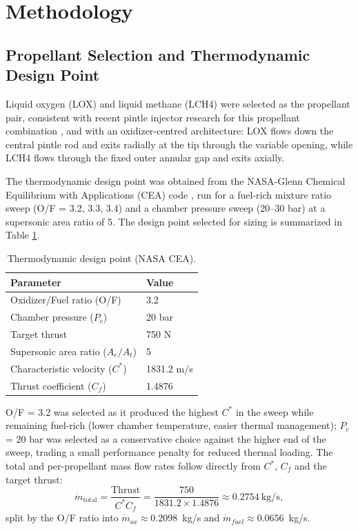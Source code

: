 \documentclass[11pt,a4paper]{article}
\begin{document}
\section{Methodology}

\subsection{Propellant Selection and Thermodynamic Design Point}

Liquid oxygen (LOX) and liquid methane (LCH4) were selected as the propellant pair, consistent with recent pintle injector research for this propellant combination \cite{vasques2017,cha2023}, and with an oxidizer-centred architecture: LOX flows down the central pintle rod and exits radially at the tip through the variable opening, while LCH4 flows through the fixed outer annular gap and exits axially.

The thermodynamic design point was obtained from the NASA-Glenn Chemical Equilibrium with Applications (CEA) code \cite{mcbride1994,gordon1996}, run for a fuel-rich mixture ratio sweep (O/F = 3.2, 3.3, 3.4) and a chamber pressure sweep (20--30 bar) at a supersonic area ratio of 5. The design point selected for sizing is summarized in Table \ref{tab:cea-point}.

\begin{table}[h]
\centering
\caption{Thermodynamic design point (NASA CEA).}
\label{tab:cea-point}
\begin{tabular}{@{}ll@{}}
\toprule
Parameter & Value \\
\midrule
Oxidizer/Fuel ratio (O/F) & 3.2 \\
Chamber pressure ($P_c$) & 20 bar \\
Target thrust & 750 N \\
Supersonic area ratio ($A_e/A_t$) & 5 \\
Characteristic velocity ($C^*$) & 1831.2 m/s \\
Thrust coefficient ($C_f$) & 1.4876 \\
\bottomrule
\end{tabular}
\end{table}

O/F = 3.2 was selected as it produced the highest $C^*$ in the sweep while remaining fuel-rich (lower chamber temperature, easier thermal management); $P_c$ = 20 bar was selected as a conservative choice against the higher end of the sweep, trading a small performance penalty for reduced thermal loading. The total and per-propellant mass flow rates follow directly from $C^*$, $C_f$ and the target thrust:
\begin{equation}
\dot{m}_{\text{total}} = \frac{\text{Thrust}}{C^* C_f} = \frac{750}{1831.2 \times 1.4876} \approx 0.2754~\text{kg/s},
\end{equation}
split by the O/F ratio into $\dot{m}_{ox} \approx 0.2098$~kg/s and $\dot{m}_{fuel} \approx 0.0656$~kg/s.
\end{document}
